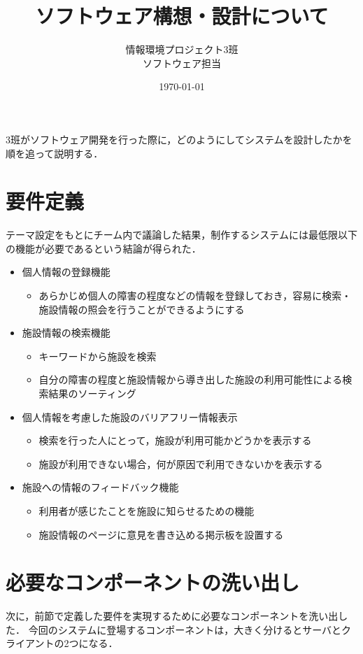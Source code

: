 \documentclass[a4paper]{jsarticle}
\title{ソフトウェア構想・設計について}
\author{情報環境プロジェクト3班 \\
ソフトウェア担当}
\date{\today}
\begin{document}
\maketitle

3班がソフトウェア開発を行った際に，どのようにしてシステムを設計したかを順を追って説明する．

\section{要件定義}
テーマ設定をもとにチーム内で議論した結果，制作するシステムには最低限以下の機能が必要であるという結論が得られた．
\begin{itemize}
\item 個人情報の登録機能
  \begin{itemize}
  \item あらかじめ個人の障害の程度などの情報を登録しておき，容易に検索・施設情報の照会を行うことができるようにする
  \end{itemize}
\item 施設情報の検索機能
  \begin{itemize}
  \item キーワードから施設を検索
  \item 自分の障害の程度と施設情報から導き出した施設の利用可能性による検索結果のソーティング
  \end{itemize}
\item 個人情報を考慮した施設のバリアフリー情報表示
  \begin{itemize}
  \item 検索を行った人にとって，施設が利用可能かどうかを表示する
  \item 施設が利用できない場合，何が原因で利用できないかを表示する
  \end{itemize}
\item 施設への情報のフィードバック機能
  \begin{itemize}
  \item 利用者が感じたことを施設に知らせるための機能
  \item 施設情報のページに意見を書き込める掲示板を設置する
  \end{itemize}
\end{itemize}

\section{必要なコンポーネントの洗い出し}
次に，前節で定義した要件を実現するために必要なコンポーネントを洗い出した．
今回のシステムに登場するコンポーネントは，大きく分けるとサーバとクライアントの2つになる．
\end{document}
